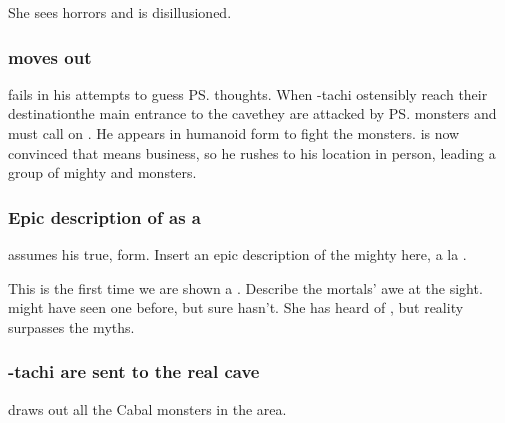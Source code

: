 She sees horrors and is disillusioned. 







\subsubsection{\Teshrial{} moves out}
\Teshrial{} fails in his attempts to guess \ps{\Ishnaruchaefir} thoughts. 
When \Shilred-tachi ostensibly reach their destination\dash the main entrance to the cave\dash they are attacked by \ps{\Teshrial} monsters and must call on \Ishnaruchaefir. 
He appears in humanoid form to fight the monsters. 
\Teshrial{} is now convinced that \Ishnaruchaefir{} means business, so he rushes to his location in person, leading a group of mighty \banes{} and monsters. 





\subsubsection{Epic description of \Ishnaruchaefir{} as a \dragon}
\Ishnaruchaefir{} assumes his true, \draconian{} form. Insert an epic description of the mighty \dragon{} here, a la . 

This is the first time we are shown a \dragon. 
Describe the mortals' awe at the sight. 
\Dzasselid{} might have seen one before, but \Shilred{} sure hasn't. 
She has heard  of \dragons{}, but reality surpasses the myths. 





\subsubsection{\Dzasselid-tachi are sent to the real cave}
\Ishnaruchaefir{} draws out all the Cabal monsters in the area. 

